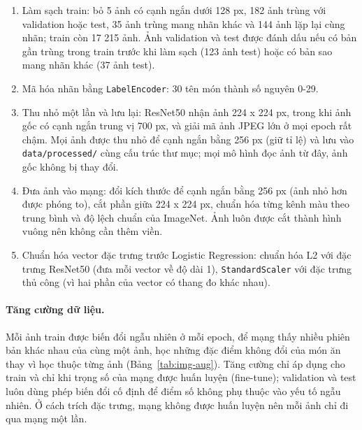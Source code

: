 \begin{enumerate}
  \item Làm sạch train: bỏ 5 ảnh có cạnh ngắn dưới 128 px, 182 ảnh trùng với validation hoặc test, 35 ảnh trùng mang nhãn
        khác và 144 ảnh lặp lại cùng nhãn; train còn 17 215 ảnh. Ảnh validation và test được đánh dấu nếu có bản gần trùng
        trong train trước khi làm sạch (123 ảnh test) hoặc có bản sao mang nhãn khác (37 ảnh test).
  \item Mã hóa nhãn bằng \texttt{LabelEncoder}: 30 tên món thành số nguyên 0-29.
  \item Thu nhỏ một lần và lưu lại: ResNet50 nhận ảnh 224 x 224 px, trong khi ảnh gốc có cạnh ngắn trung vị 700 px, và
        giải mã ảnh JPEG lớn ở mọi epoch rất chậm. Mọi ảnh được thu nhỏ để cạnh ngắn bằng 256 px (giữ tỉ lệ) và lưu vào
        \texttt{data/processed/} cùng cấu trúc thư mục; mọi mô hình đọc ảnh từ đây, ảnh gốc không bị thay đổi.
  \item Đưa ảnh vào mạng: đổi kích thước để cạnh ngắn bằng 256 px (ảnh nhỏ hơn được phóng to), cắt phần giữa
        224 x 224 px, chuẩn hóa từng kênh màu theo trung bình và độ lệch chuẩn của ImageNet. Ảnh luôn được cắt thành hình
        vuông nên không cần thêm viền.
  \item Chuẩn hóa vector đặc trưng trước Logistic Regression: chuẩn hóa L2 với đặc trưng ResNet50 (đưa mỗi vector về độ
        dài 1), \texttt{StandardScaler} với đặc trưng thủ công (vì hai phần của vector có thang đo khác nhau).
\end{enumerate}

\paragraph{Tăng cường dữ liệu.} Mỗi ảnh train được biến đổi ngẫu nhiên ở mỗi epoch, để mạng thấy nhiều phiên bản khác
nhau của cùng một ảnh, học những đặc điểm không đổi của món ăn thay vì học thuộc từng ảnh
(Bảng~\ref{tab:img-aug}). Tăng cường chỉ áp dụng cho train và chỉ khi trọng số của mạng được huấn luyện (fine-tune);
validation và test luôn dùng phép biến đổi cố định để điểm số không phụ thuộc vào yếu tố ngẫu nhiên. Ở cách trích đặc
trưng, mạng không được huấn luyện nên mỗi ảnh chỉ đi qua mạng một lần.

